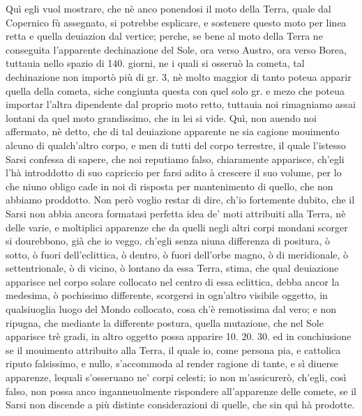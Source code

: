 \documentclass[11pt,twoside,openany]{book}
\begin{document}
Quì egli vuol mostrare, che nè anco ponendosi il moto della Terra, quale dal Copernico fù assegnato, si potrebbe esplicare, e sostenere questo moto per linea retta e quella deuiazion dal vertice; perche, se bene al moto della Terra ne conseguita l'apparente dechinazione del Sole, ora verso Austro, ora verso Borea, tuttauia nello spazio di 140. giorni, ne i quali si osseruò la cometa, tal dechinazione non importò più di gr. 3, nè molto maggior di tanto poteua apparir quella della cometa, siche congiunta questa con quel solo gr. e mezo che poteua importar l'altra dipendente dal proprio moto retto, tuttauia noi rimagniamo assai lontani da quel moto grandissimo, che in lei si vide. Quì, non auendo noi affermato, nè detto, che di tal deuiazione apparente ne sia cagione mouimento alcuno di qualch'altro corpo, e men di tutti del corpo terrestre, il quale l'istesso Sarsi confessa di sapere, che noi reputiamo falso, chiaramente apparisce, ch'egli l'hà introddotto di suo capriccio per farsi adito à crescere il suo volume, per lo che niuno obligo cade in noi di risposta per mantenimento di quello, che non abbiamo proddotto. Non però voglio restar di dire, ch'io fortemente dubito, che il Sarsi non abbia ancora formatasi perfetta idea de' moti attribuiti alla Terra, nè delle varie, e moltiplici apparenze che da quelli negli altri corpi mondani scorger si dourebbono, già che io veggo, ch'egli senza niuna differenza di positura, ò sotto, ò fuori dell'eclittica, ò dentro, ò fuori dell'orbe magno, ò di meridionale, ò settentrionale, ò di vicino, ò lontano da essa Terra, stima, che qual deuiazione apparisce nel corpo solare collocato nel centro di essa eclittica, debba ancor la medesima, ò pochissimo differente, scorgersi in ogn'altro visibile oggetto, in qualsiuoglia luogo del Mondo collocato, cosa ch'è remotissima dal vero; e non ripugna, che mediante la differente postura, quella mutazione, che nel Sole apparisce trè gradi, in altro oggetto possa apparire 10. 20. 30. ed in conchiusione se il mouimento attribuito alla Terra, il quale io, come persona pia, e cattolica riputo falsissimo, e nullo, s'accommoda al render ragione di tante, e sì diuerse apparenze, lequali s'osseruano ne' corpi celesti; io non m'assicurerò, ch'egli, così falso, non possa anco inganneuolmente rispondere all'apparenze delle comete, se il Sarsi non discende a più distinte considerazioni di quelle, che sin quì hà prodotte.
\end{document}
